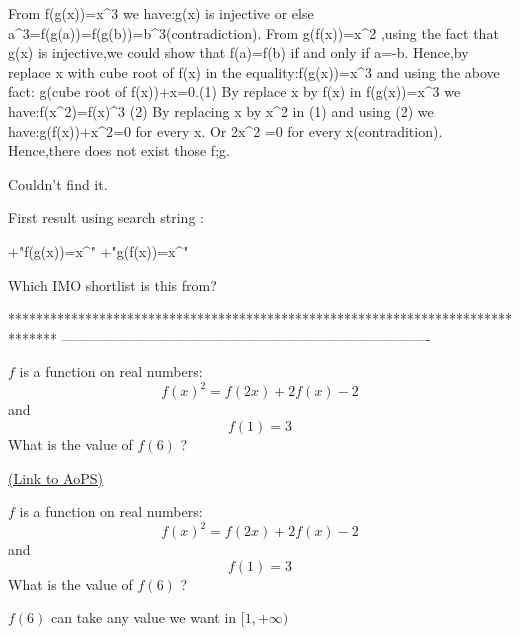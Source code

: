 \begin{solution}
	From f(g(x))=x^3 we have:g(x) is injective or else a^3=f(g(a))=f(g(b))=b^3(contradiction).
From g(f(x))=x^2 ,using the fact that g(x) is injective,we could show that f(a)=f(b) if and only if a=-b.
Hence,by replace x with cube root of f(x) in the equality:f(g(x))=x^3 and using the above fact:
g(cube root of f(x))+x=0.(1)
By replace x by f(x) in f(g(x))=x^3 we have:f(x^2)=f(x)^3 (2)
By replacing x by x^2 in (1) and using (2) we have:g(f(x))+x^2=0 for every x.
              Or 2x^2 =0 for every x(contradition).
Hence,there does not exist those f;g.
\end{solution}



\begin{solution}
	\begin{tcolorbox}Couldn't find it.\end{tcolorbox}
First result using search string :

 +"f(g(x))=x^" +"g(f(x))=x^"


\end{solution}



\begin{solution}
	Which IMO shortlist is this from?
\end{solution}
*******************************************************************************
-------------------------------------------------------------------------------

\begin{problem}
	$f$  is a function on real numbers: $$f(x)^2=f(2x)+2f(x)-2$$ and $$f(1)=3$$ What is the value of $f(6)$ ?

	\flushright \href{https://artofproblemsolving.com/community/c6h1573785}{(Link to AoPS)}
\end{problem}



\begin{solution}
	\begin{tcolorbox}$f$  is a function on real numbers: $$f(x)^2=f(2x)+2f(x)-2$$ and $$f(1)=3$$ What is the value of $f(6)$ ?\end{tcolorbox}
$f(6)$ can take any value we want in $[1,+\infty)$


\end{solution}



